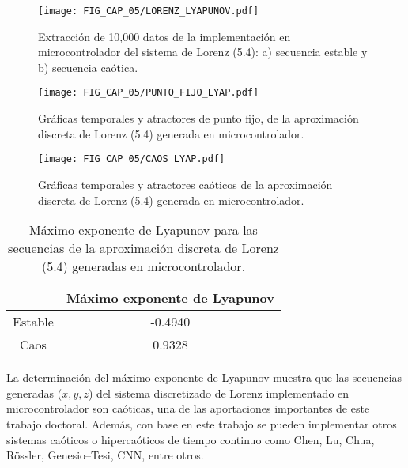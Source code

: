 \begin{figure}[!htbp] %
	\center
	\texttt{[image: FIG\_CAP\_05/LORENZ\_LYAPUNOV.pdf]}    
	\caption{Extracción de 10,000 datos de la implementación en microcontrolador del sistema de Lorenz (5.4): a) secuencia estable y b) secuencia caótica.}
\end{figure}

\begin{figure}[!htbp] %
	\center
	\texttt{[image: FIG\_CAP\_05/PUNTO\_FIJO\_LYAP.pdf]}    
	\caption{Gráficas temporales y atractores de punto fijo, de la aproximación discreta de Lorenz (5.4) generada en microcontrolador.}
\end{figure}

\begin{figure}[!htbp] %
	\center
	\texttt{[image: FIG\_CAP\_05/CAOS\_LYAP.pdf]}     
	\caption{Gráficas temporales y atractores caóticos de la aproximación discreta de Lorenz (5.4) generada en microcontrolador.}
\end{figure}

\begin{table}[!htbp] %
	\center
	\begin{tabular}{c c} 
	\hline
				&	Máximo exponente de Lyapunov	\\
	\hline
	Estable		&	-0.4940							\\
	Caos		&	0.9328							\\
	\hline
\end{tabular}
	\caption{Máximo exponente de Lyapunov para las secuencias de la aproximación discreta de Lorenz (5.4) generadas en microcontrolador.}
\end{table}

La determinación del máximo exponente de Lyapunov muestra que las secuencias generadas ($x,y,z$) del sistema discretizado de Lorenz implementado en microcontrolador son caóticas, una de las aportaciones importantes de este trabajo doctoral. Además, con base en este trabajo se pueden implementar otros sistemas caóticos o hipercaóticos de tiempo continuo como Chen, Lu, Chua, Rössler, Genesio–Tesi, CNN, entre otros.


